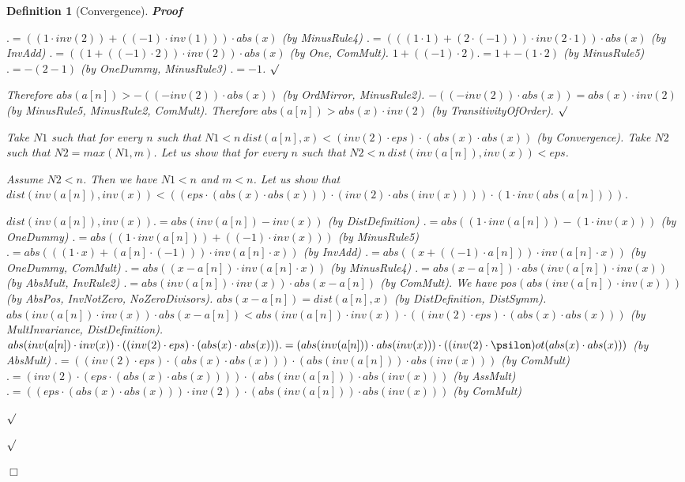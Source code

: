 \documentclass{article}
\newenvironment{forthel}{\begin{leftbar}}{\end{leftbar}}
\newenvironment{proof}{\noindent\textbf{Proof\ }}{\hspace*{\fill}$\Box$\medskip}
\newenvironment{subproof}{\begin{list}{}{}
		\item[\text{Proof}]}{\hfill $\surd$ \end{list}}
\newtheorem{definition}{Definition}
\begin{document}
\begin{forthel}
\begin{definition}[Convergence]
\begin{proof}
\begin{subproof}
\begin{subproof}
	$.= ((1 \cdot inv(2)) + ((-1) \cdot inv(1))) \cdot abs(x)$ (by MinusRule4)
	$.= (((1 \cdot 1) + (2 \cdot (-1))) \cdot inv(2 \cdot 1)) \cdot abs(x)$ (by InvAdd)
	$.= ((1 + ((-1) \cdot 2)) \cdot inv(2)) \cdot abs(x)$ (by One, ComMult).
	$1 + ((-1) \cdot 2) .= 1 + -(1 \cdot 2)$ (by MinusRule5)
	$.= -(2 - 1)$ (by OneDummy, MinusRule3)
	$.= -1$. 
	\end{subproof}
    Therefore $abs(a[n]) > -((-inv(2)) \cdot abs(x))$ (by OrdMirror, MinusRule2).
    $-((-inv(2)) \cdot abs(x)) = abs(x) \cdot inv(2)$ (by MinusRule5, MinusRule2, ComMult).
    Therefore $abs(a[n]) > abs(x) \cdot inv(2)$ (by TransitivityOfOrder).
	\end{subproof}
	Take $N1$ such that for every $n$ such that $N1 < n \ dist(a[n],x) < (inv(2) \cdot eps) \cdot (abs(x) \cdot abs(x))$ (by Convergence). 
	Take $N2$ such that $N2 = max(N1,m)$.
	Let us show that for every $n$ such that $N2 < n \ dist(inv(a[n]),inv(x)) < eps$.
	\begin{subproof}
	Assume $N2 < n$.
	Then we have $N1 < n$ and $m < n$.
	Let us show that $dist(inv(a[n]),inv(x)) < ((eps \cdot (abs(x) \cdot abs(x))) \cdot (inv(2) \cdot abs(inv(x)))) \cdot (1 \cdot inv(abs(a[n])))$.
	\begin{subproof}
	$dist(inv(a[n]),inv(x)) .= abs(inv(a[n]) - inv(x))$ (by DistDefinition)
	$.= abs((1 \cdot inv(a[n])) - (1 \cdot inv(x)))$ (by OneDummy)
	$.= abs((1 \cdot inv(a[n])) + ((-1) \cdot inv(x)))$ (by MinusRule5)
	$.= abs(((1 \cdot x) + (a[n] \cdot (-1))) \cdot inv(a[n] \cdot x))$ (by InvAdd)
	$.= abs((x + ((-1) \cdot a[n])) \cdot inv(a[n] \cdot x))$ (by OneDummy, ComMult)
	$.= abs((x - a[n]) \cdot inv(a[n] \cdot x))$ (by MinusRule4)
	$.= abs(x - a[n]) \cdot abs(inv(a[n]) \cdot inv(x))$ (by AbsMult, InvRule2)
	$.= abs(inv(a[n]) \cdot inv(x)) \cdot abs(x - a[n])$ (by ComMult).
	We have $pos(abs(inv(a[n]) \cdot inv(x)))$ (by AbsPos, InvNotZero, NoZeroDivisors).
	$abs(x - a[n]) = dist(a[n],x)$ (by DistDefinition, DistSymm).
	$abs(inv(a[n]) \cdot inv(x)) \cdot abs(x - a[n]) < abs(inv(a[n]) \cdot inv(x)) \cdot ((inv(2) \cdot eps) \cdot (abs(x) \cdot abs(x)))$ (by MultInvariance, DistDefinition).
	$abs(inv(a[n]) \cdot inv(x)) \cdot ((inv(2) \cdot eps) \cdot (abs(x) \cdot abs(x))) .= (abs(inv(a[n])) \cdot abs(inv(x))) \cdot ((inv(2) \cdot \psilon)ot (abs(x) \cdot abs(x)))$ (by AbsMult)
	$.= ((inv(2) \cdot eps) \cdot (abs(x) \cdot abs(x))) \cdot (abs(inv(a[n])) \cdot abs(inv(x)))$ (by ComMult)
	$.= (inv(2) \cdot (eps \cdot (abs(x) \cdot abs(x)))) \cdot (abs(inv(a[n])) \cdot abs(inv(x)))$ (by AssMult)
	$.= ((eps \cdot (abs(x) \cdot abs(x))) \cdot inv(2)) \cdot (abs(inv(a[n])) \cdot abs(inv(x)))$ (by ComMult) 

\end{subproof}
\end{subproof}
\end{proof}
\end{definition}
\end{forthel}
\end{document}
